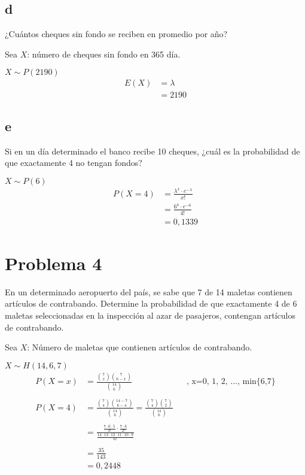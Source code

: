 \documentclass{templateNote}
\begin{document}
\newpage
\subsection{d}
¿Cuántos cheques sin fondo se reciben en promedio por año?

Sea $X$: número de cheques sin fondo en 365 día.

$X \sim P(2190)$
\begin{align*}
    E(X) &= \lambda \\
    &= 2190
\end{align*}
\subsection{e}
Si en un día determinado el banco recibe 10 cheques, ¿cuál es la probabilidad de que exactamente 4
no tengan fondos?

$X \sim P(6)$
\begin{align*}
    P(X=4) &= \frac{\lambda^x \cdot e^{-\lambda}}{x!} \\
    &= \frac{6^4 \cdot e^{-6}}{4!} \\
    &= 0,1339
\end{align*}

\section{Problema 4}
En un determinado aeropuerto del país, se sabe que 7 de 14 maletas contienen artículos de contrabando.
Determine la probabilidad de que exactamente 4 de 6 maletas seleccionadas en la inspección al azar de
pasajeros, contengan artículos de contrabando.

Sea $X$: Número de maletas que contienen artículos de contrabando.

$X \sim H(14, 6, 7)$
\begin{align*}
    P(X=x) &=  \frac{\displaystyle \binom{7}{x} \binom{7}{6-x}}{\displaystyle \binom{14}{6}}  && \text{, x=0, 1, 2, ..., min\{6,7\}}\\
    \\
    P(X=4) &= \frac{\displaystyle \binom{7}{4} \binom{14-7}{6-4}}{\displaystyle \binom{14}{6}} = \frac{\displaystyle \binom{7}{4} \binom{7}{2}}{\displaystyle \binom{14}{6}} \\
    \\
    &= \frac{\displaystyle \frac{7 \cdot 6 \cdot 5}{3!} \cdot \frac{7 \cdot 6}{2!}}{\displaystyle \frac{14 \cdot 13 \cdot 12 \cdot 11 \cdot 10 \cdot 9}{6!}} \\
    \\
    &= \frac{35}{143} \\
    &= 0,2448
\end{align*}
\end{document}

